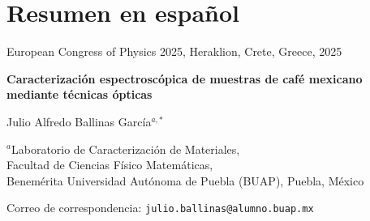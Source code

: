 \documentclass{article}
\newcommand{\PaperTitle}{}        %
\newcommand{\PaperAuthors}{}      %
\newcommand{\PaperAffils}{}       %
\newcommand{\PaperDates}{}        %
\newcommand{\PaperJournal}{}      %
\begin{document}
\tableofcontents \newpage


\section{Resumen en español}

\renewcommand{\PaperJournal}{European Congress of Physics 2025, Heraklion, Crete, Greece, 2025}
\renewcommand{\PaperTitle}{Caracterización espectroscópica de muestras de café mexicano mediante técnicas ópticas}
\renewcommand{\PaperAuthors}{Julio Alfredo Ballinas García$^{a,*}$}
\renewcommand{\PaperAffils}{$^{a}$Laboratorio de Caracterización de Materiales, \\
Facultad de Ciencias Físico Matemáticas, \\
Benemérita Universidad Autónoma de Puebla (BUAP), Puebla, México}
\renewcommand{\PaperDates}{Correo de correspondencia: \texttt{julio.ballinas@alumno.buap.mx}}

\begin{articleheader}
  {\small\PaperJournal\par}
  {\Large\bfseries \PaperTitle\par}
  \vspace{4pt}
  {\normalsize \PaperAuthors\par}
  {\footnotesize \PaperAffils\par}
  {\scriptsize \PaperDates\par}
\end{articleheader}
\end{document}
